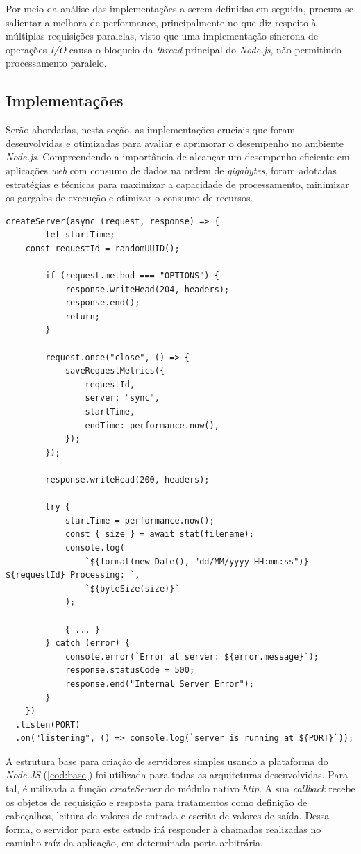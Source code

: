\documentclass[12pt]{article}
\begin{document}
Por meio da análise das implementações a serem definidas em seguida, procura-se salientar a melhora de performance,
principalmente no que diz respeito à múltiplas requisições paralelas, visto que uma implementação síncrona de operações
\textit{I/O} causa o bloqueio da \textit{thread} principal do \textit{Node.js}, não permitindo processamento paralelo.


\subsection{Implementações}

Serão abordadas, nesta seção, as implementações cruciais que foram desenvolvidas e 
otimizadas para avaliar e aprimorar o desempenho no ambiente \textit{Node.js}. Compreendendo a 
importância de alcançar um desempenho eficiente em aplicações \textit{web} com consumo de dados na ordem
de \textit{gigabytes}, foram adotadas estratégias e técnicas para maximizar a capacidade de 
processamento, minimizar os gargalos de execução e otimizar o consumo de recursos. 

\begin{lstlisting}[caption={Quadro base para um servidor \textit{Node.JS}}, label=cod:base]
	createServer(async (request, response) => {
		let startTime;
  	const requestId = randomUUID();

		if (request.method === "OPTIONS") {
			response.writeHead(204, headers);
			response.end();
			return;
		}

		request.once("close", () => {
			saveRequestMetrics({
				requestId,
				server: "sync",
				startTime,
				endTime: performance.now(),
			});
		});

		response.writeHead(200, headers);

		try {
			startTime = performance.now();
			const { size } = await stat(filename);
			console.log(
				`${format(new Date(), "dd/MM/yyyy HH:mm:ss")} ${requestId} Processing: `,
				`${byteSize(size)}`
			);

			{ ... }
		} catch (error) {
			console.error(`Error at server: ${error.message}`);
			response.statusCode = 500;
			response.end("Internal Server Error");
		}
	})
  .listen(PORT)
  .on("listening", () => console.log(`server is running at ${PORT}`));
\end{lstlisting}

A estrutura base para criação de servidores simples usando a 
plataforma do \textit{Node.JS} (\autoref{cod:base}) foi utilizada para todas as arquiteturas desenvolvidas. 
Para tal, é utilizada a função \textit{createServer} do módulo nativo \textit{http}.
A sua \textit{callback} recebe os objetos de requisição e resposta para tratamentos como definição de cabeçalhos, leitura
de valores de entrada e escrita de valores de saída. Dessa forma, o servidor para este estudo irá responder à chamadas
realizadas no caminho raíz da aplicação, em determinada porta arbitrária.
\end{document}
